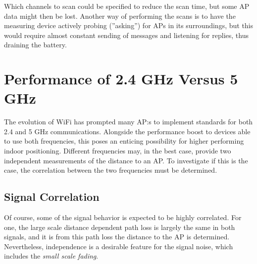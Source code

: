 \documentclass{LTHthesis}
\begin{document}
Which channels to scan could be specified to reduce the scan time, but some AP data might then be lost. Another way of performing the scans is to have the measuring device actively probing (''asking'') for APs in its surroundings, but this would require almost constant sending of messages and listening for replies, thus draining the battery.               
%
\section{Performance of 2.4 GHz Versus 5 GHz}
%
The evolution of WiFi has prompted many AP:s to implement standards for both 2.4 and 5 GHz communications. Alongside the performance boost to devices able to use both frequencies, this poses an enticing possibility for higher performing indoor positioning. Different frequencies may, in the best case, provide two independent measurements of the distance to an AP. To investigate if this is the case, the correlation between the two frequencies must be determined.  
%
\subsection{Signal Correlation}
%
Of course, some of the signal behavior is expected to be highly correlated. For one, the large scale distance dependent path loss is largely the same in both signals, and it is from this path loss the distance to the AP is determined. Nevertheless, independence is a desirable feature for the signal noise, which includes the \emph{small scale fading}. 
\end{document}
